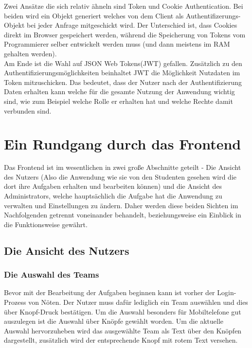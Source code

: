 Zwei Ansätze die sich relativ ähneln sind Token und Cookie Authentication. Bei beiden wird ein Objekt generiert welches von dem Client als Authentifizerungs-Objekt bei jeder Anfrage mitgeschickt wird. Der Unterschied ist, dass Cookies direkt im Browser gespeichert werden, während die Speicherung von Tokens vom Programmierer selber entwickelt werden muss (und dann meistens im RAM gehalten werden). \\

Am Ende ist die Wahl auf JSON Web Tokens(JWT) gefallen. Zusätzlich zu den Authentifizierungsmöglichkeiten beinhaltet JWT die Möglichkeit Nutzdaten im Token mitzuschicken. Das bedeutet, dass der Nutzer nach der Authentifizierung Daten erhalten kann welche für die gesamte Nutzung der Anwendung wichtig sind, wie zum Beispiel welche Rolle er erhalten hat und welche Rechte damit verbunden sind. 

\chapter{Ein Rundgang durch das Frontend}

Das Frontend ist im wesentlichen in zwei große Abschnitte geteilt - Die Ansicht des Nutzers (Also die Anwendung wie sie von den Studenten gesehen wird die dort ihre Aufgaben erhalten und bearbeiten können) und die Ansicht des Administrators, welche hauptsächlich die Aufgabe hat die Anwendung zu verwalten und Einstellungen zu ändern. Daher werden diese beiden Sichten im Nachfolgenden getrennt voneinander behandelt, beziehungsweise ein Einblick in die Funktionsweise gewährt.

\section{Die Ansicht des Nutzers}


\subsection{Die Auswahl des Teams}

Bevor mit der Bearbeitung der Aufgaben beginnen kann ist vorher der Login-Prozess von Nöten. Der Nutzer muss dafür lediglich ein Team auswählen und dies über Knopf-Druck bestätigen. Um die Auswahl besonders für Mobiltelefone gut auszulegen ist die Auswahl über Knöpfe gewählt worden. Um die aktuelle Auswahl hervorzuheben wird das ausgewählte Team als Text über den Knöpfen dargestellt, zusätzlich wird der entsprechende Knopf mit rotem Text versehen.


